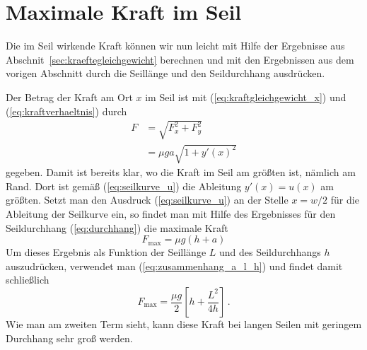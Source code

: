 \documentclass[twocolumn,nobalancelastpage]{revtex4}
\begin{document}
\section{Maximale Kraft im Seil}
Die im Seil wirkende Kraft können wir nun leicht mit Hilfe der
Ergebnisse aus Abschnit~\ref{sec:kraeftegleichgewicht} berechnen
und mit den Ergebnissen aus dem vorigen Abschnitt durch die Seillänge
und den Seildurchhang ausdrücken.

Der Betrag der Kraft am Ort $x$ im Seil ist mit
(\ref{eq:kraftgleichgewicht_x}) und (\ref{eq:kraftverhaeltnis}) durch
\begin{equation}
 \begin{aligned}
  F &= \sqrt{F_x^2+F_y^2}\\
    &= \mu ga\sqrt{1+y'(x)^2}
 \end{aligned}
\end{equation}
gegeben. Damit ist bereits klar, wo die Kraft im Seil am größten ist,
nämlich am Rand. Dort ist gemäß (\ref{eq:seilkurve_u}) die Ableitung
$y'(x)=u(x)$ am größten. Setzt man den Ausdruck (\ref{eq:seilkurve_u})
an der Stelle $x=w/2$ für die Ableitung der Seilkurve ein, so findet
man mit Hilfe des Ergebnisses für den Seildurchhang
(\ref{eq:durchhang}) die maximale Kraft
\begin{equation}
 F_\text{max} = \mu g(h+a)
\end{equation}
Um dieses Ergebnis als Funktion der Seillänge $L$ und des
Seildurchhangs $h$ auszudrücken, verwendet man
(\ref{eq:zusammenhang_a_l_h}) und findet damit schließlich
\begin{equation}
 F_\text{max} = \frac{\mu g}{2}\left[h+\frac{L^2}{4h}\right]\,.
\end{equation}
Wie man am zweiten Term sieht, kann diese Kraft bei langen Seilen
mit geringem Durchhang sehr groß werden.
\end{document}
